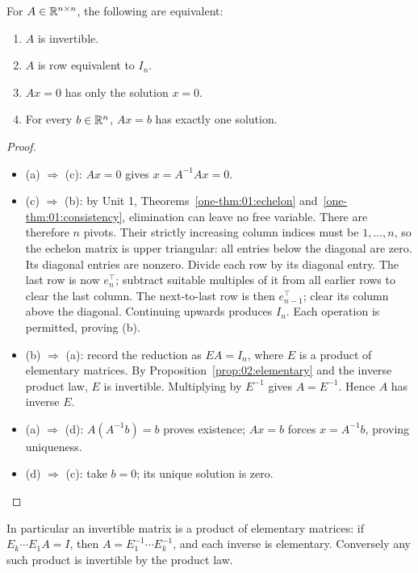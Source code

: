 \begin{theorem}\label{thm:02:inverse}
For \(A\in\mathbb R^{n\times n}\), the following are equivalent:
\begin{enumerate}
\item \(A\) is invertible.
\item \(A\) is row equivalent to \(I_n\).
\item \(Ax=0\) has only the solution \(x=0\).
\item For every \(b\in\mathbb R^n\), \(Ax=b\) has exactly one solution.
\end{enumerate}
\end{theorem}
\begin{proof}
\begin{itemize}
\item (a) \(\Longrightarrow\) (c): \(Ax=0\) gives \(x=A^{-1}Ax=0\).
\item {}(c) \(\Longrightarrow\) (b): by Unit 1, Theorems~\ref{one-thm:01:echelon}
and~\ref{one-thm:01:consistency}, elimination can leave no free variable.
There are therefore \(n\) pivots. Their strictly increasing column
indices must be \(1,\ldots,n\), so the echelon matrix is upper triangular:
all entries below the diagonal are zero. Its diagonal entries are nonzero.
Divide each row by its diagonal entry.
The last row is now \(e_n^\top\); subtract suitable multiples of it from
all earlier rows to clear the last column. The next-to-last row is then
\(e_{n-1}^\top\); clear its column above the diagonal. Continuing upwards
produces \(I_n\). Each operation is permitted, proving (b).

\item {}(b) \(\Longrightarrow\) (a): record the reduction as \(EA=I_n\), where \(E\) is a
product of elementary matrices. By Proposition~\ref{prop:02:elementary}
and the inverse product law, \(E\) is invertible. Multiplying by
\(E^{-1}\) gives \(A=E^{-1}\). Hence \(A\) has inverse \(E\).

\item (a) \(\Longrightarrow\) (d): \(A(A^{-1}b)=b\) proves existence;
\(Ax=b\) forces \(x=A^{-1}b\), proving uniqueness.
\item (d) \(\Longrightarrow\) (c): take \(b=0\); its unique solution is zero.
\end{itemize}
\end{proof}
In particular an invertible matrix is a product of elementary matrices:
if \(E_k\cdots E_1A=I\), then
\(A=E_1^{-1}\cdots E_k^{-1}\), and each inverse is elementary.
Conversely any such product is invertible by the product law.

